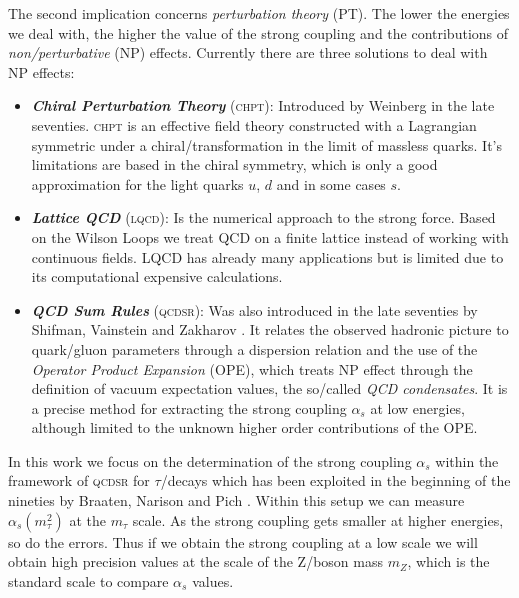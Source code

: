 \documentclass[../../index.tex]{subfiles}
\begin{document}
The second implication concerns \textit{perturbation theory} (PT). The lower the
energies we deal with, the higher the value of the strong coupling and the
contributions of \textit{non\-/perturbative} (NP) effects. Currently there are
three solutions to deal with NP effects:
\begin{itemize}
\item \textbf{\textit{Chiral Perturbation Theory}} (\textsc{chpt}): Introduced by
  Weinberg \cite{Weinberg1978} in the late seventies. \textsc{chpt} is an effective field
  theory constructed with a Lagrangian symmetric under a chiral\-/transformation in
  the limit of massless quarks. It's limitations are based in the chiral
  symmetry, which is only a good approximation for the light quarks $u$, $d$ and
  in some cases $s$.
\item \textbf{\textit{Lattice QCD}} (\textsc{lqcd}): Is the numerical approach to the
  strong force. Based on the Wilson Loops \cite{Wilson1974} we treat QCD on a
  finite lattice instead of working with continuous fields. LQCD has already
  many applications but is limited due to its computational expensive
  calculations.
\item \textbf{\textit{QCD Sum Rules}} (\textsc{qcdsr}): Was also introduced in the late
  seventies by Shifman, Vainstein and Zakharov \cite{Shifman1978,Shifman1978a}.
  It relates the observed hadronic picture to quark\-/gluon parameters through a
  dispersion relation and the use of the \textit{Operator Product Expansion}
  (OPE), which treats NP effect through the definition of vacuum expectation
  values, the so\-/called \textit{QCD condensates}. It is a precise method for
  extracting the strong coupling $\alpha_s$ at low energies, although limited to
  the unknown higher order contributions of the OPE.
\end{itemize}

In this work we focus on the determination of the strong coupling $\alpha_s$
within the framework of \textsc{qcdsr} for $\tau$\-/decays which has been
exploited in the beginning of the nineties by Braaten, Narison and Pich
\cite{Braaten1991}. Within this setup we can measure $\alpha_s(m_\tau^2)$ at the
$m_\tau$ scale. As the strong coupling gets smaller at higher energies, so do
the errors. Thus if we obtain the strong coupling at a low scale we will obtain
high precision values at the scale of the Z\-/boson mass $m_Z$, which is the
standard scale to compare $\alpha_s$ values.
\end{document}
